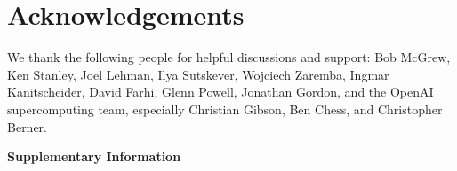 \documentclass{article}
\begin{document}
{}



\section*{Acknowledgements} %

 We thank the following people for helpful discussions and support: Bob McGrew, Ken Stanley, Joel Lehman,
 Ilya Sutskever, 
 Wojciech Zaremba, 
 Ingmar Kanitscheider, 
 David Farhi,
 Glenn Powell,
 Jonathan Gordon, and the OpenAI supercomputing team, especially Christian Gibson, Ben Chess, and Christopher Berner.

\newpage
\begin{center}
\textbf{\Large{Supplementary Information}}    
\end{center}
\appendix







\end{document}
